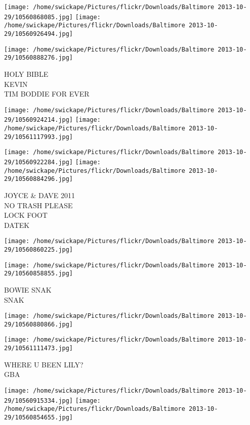 \documentclass[10pt,letterpaper]{article}
\begin{document}
\texttt{[image: /home/swickape/Pictures/flickr/Downloads/Baltimore 2013-10-29/10560868085.jpg]}
\texttt{[image: /home/swickape/Pictures/flickr/Downloads/Baltimore 2013-10-29/10560926494.jpg]}

\vspace{0.25in}
\texttt{[image: /home/swickape/Pictures/flickr/Downloads/Baltimore 2013-10-29/10560888276.jpg]}

HOLY BIBLE\\
KEVIN\\
TIM BODDIE FOR EVER
\pagebreak

\texttt{[image: /home/swickape/Pictures/flickr/Downloads/Baltimore 2013-10-29/10560924214.jpg]}
\texttt{[image: /home/swickape/Pictures/flickr/Downloads/Baltimore 2013-10-29/10561117993.jpg]}

\texttt{[image: /home/swickape/Pictures/flickr/Downloads/Baltimore 2013-10-29/10560922284.jpg]}
\texttt{[image: /home/swickape/Pictures/flickr/Downloads/Baltimore 2013-10-29/10560884296.jpg]}

JOYCE \& DAVE 2011\\
NO TRASH PLEASE\\
LOCK FOOT\\
DATEK
\pagebreak

\texttt{[image: /home/swickape/Pictures/flickr/Downloads/Baltimore 2013-10-29/10560860225.jpg]}

\vspace{0.25in}
\texttt{[image: /home/swickape/Pictures/flickr/Downloads/Baltimore 2013-10-29/10560858855.jpg]}

BOWIE SNAK\\
SNAK
\pagebreak

\texttt{[image: /home/swickape/Pictures/flickr/Downloads/Baltimore 2013-10-29/10560880866.jpg]}

\vspace{0.25in}
\texttt{[image: /home/swickape/Pictures/flickr/Downloads/Baltimore 2013-10-29/10561111473.jpg]}

WHERE U BEEN LILY?\\
GBA
\pagebreak

\texttt{[image: /home/swickape/Pictures/flickr/Downloads/Baltimore 2013-10-29/10560915334.jpg]}
\texttt{[image: /home/swickape/Pictures/flickr/Downloads/Baltimore 2013-10-29/10560854655.jpg]}
\end{document}
